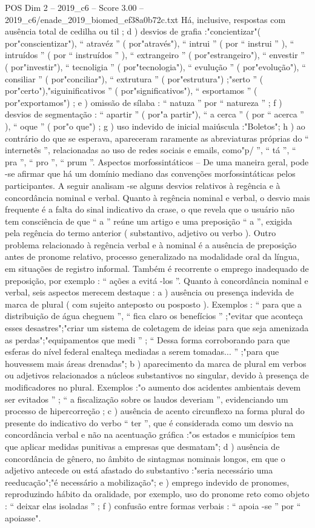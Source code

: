 \begin{textsample}{POS Dim 2 – 2019\_c6 – Score 3.00 – 2019\_c6/enade\_2019\_biomed\_ef38a0b72c.txt}
Há, inclusive, respostas com ausência total de cedilha ou til ; d ) desvios de grafia :"concientizar"( por"conscientizar"), “ atravéz ” ( por"através"), “ intrui ” ( por “ instrui ” ), “ intruídos ” ( por “ instruídos ” ), “ extrangeiro ” ( por"estrangeiro"), “ envestir ” ( por"investir"), “ tecnoligia ” ( por"tecnologia"), “ evulução ” ( por"evolução"), “ consiliar ” ( por"conciliar"), “ extrutura ” ( por"estrutura") ;"serto ” ( por"certo"),"siguinificativos ” ( por"significativos"), “ esportamos ” ( por"exportamos") ; e ) omissão de sílaba : “ natuza ” por “ natureza ” ; f ) desvios de segmentação : “ apartir ” ( por"a partir"), “ a cerca ” ( por “ acerca ” ), “ oque ” ( por"o que") ; g ) uso indevido de inicial maiúscula :"Boletos"; h ) ao contrário do que se esperava, apareceram raramente as abreviaturas próprias do “ internetês ”, relacionadas ao uso de redes sociais e emails, como"p/ ”, “ tá ”, “ pra ”, “ pro ”, “ prum ”.
Aspectos morfossintáticos – De uma maneira geral, pode -se afirmar que há um domínio mediano das convenções morfossintáticas pelos participantes.
A seguir analisam -se alguns desvios relativos à regência e à concordância nominal e verbal.
Quanto à regência nominal e verbal, o desvio mais frequente é a falta do sinal indicativo da crase, o que revela que o usuário não tem consciência de que “ a ” reúne um artigo e uma preposição “ a ”, exigida pela regência do termo anterior ( substantivo, adjetivo ou verbo ).
Outro problema relacionado à regência verbal e à nominal é a ausência de preposição antes de pronome relativo, processo generalizado na modalidade oral da língua, em situações de registro informal.
Também é recorrente o emprego inadequado de preposição, por exemplo : “ ações a evitá -los ”.
Quanto à concordância nominal e verbal, seis aspectos merecem destaque : a ) ausência ou presença indevida de marca de plural ( com sujeito anteposto ou posposto ).
Exemplos : “ para que a distribuição de água cheguem ”, “ fica claro os benefícios ” ;"evitar que aconteça esses desastres";"criar um sistema de coletagem de ideias para que seja amenizada as perdas";"equipamentos que medi ” ; “ Dessa forma corroborando para que esferas do nível federal enalteça mediadas a serem tomadas... ” ;"para que houvessem mais áreas drenadas"; b ) aparecimento da marca de plural em verbos ou adjetivos relacionados a núcleos substantivos no singular, devido à presença de modificadores no plural.
Exemplos :"o aumento dos acidentes ambientais devem ser evitados ” ; “ a fiscalização sobre os laudos deveriam ”, evidenciando um processo de hipercorreção ; c ) ausência de acento circunflexo na forma plural do presente do indicativo do verbo “ ter ”, que é considerada como um desvio na concordância verbal e não na acentuação gráfica :"os estados e municípios tem que aplicar medidas punitivas a empresas que desmatam"; d ) ausência de concordância de gênero, no âmbito de sintagmas nominais longos, em que o adjetivo antecede ou está afastado do substantivo :"seria necessário uma reeducação";"é necessário a mobilização"; e ) emprego indevido de pronomes, reproduzindo hábito da oralidade, por exemplo, uso do pronome reto como objeto : “ deixar elas isoladas ” ; f ) confusão entre formas verbais : “ apoia -se ” por “ apoiasse".

\end{textsample}
